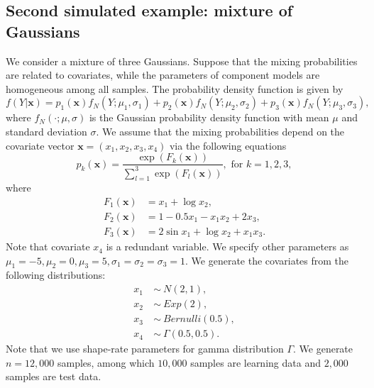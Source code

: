 \documentclass[11pt]{article}
\numberwithin{equation}{section}
\def\bx{\boldsymbol{x}}
\begin{document}
\subsection{Second simulated example: mixture of Gaussians}

We consider a mixture of three Gaussians. 
Suppose that the mixing probabilities are related to covariates, while the parameters of component models are homogeneous among all samples.
The probability density function is given by
\begin{equation}\label{gaussian-true}
f(Y|\bx)=p_1(\bx)f_N(Y;\mu_1,\sigma_1)+p_2(\bx)f_N(Y;\mu_2,\sigma_2)+p_3(\bx)f_N(Y;\mu_3,\sigma_3),
\end{equation}
where $f_N(\cdot;\mu,\sigma)$ is the Gaussian probability density function with mean $\mu$ and standard deviation $\sigma$.
We assume that the mixing probabilities depend on the covariate vector $\bx=(x_1,x_2,x_3,x_4)$ via the following equations
\begin{equation}\label{logistic-ex}
	p_k(\bx)=\frac{\exp\left(F_k(\bx)\right)}{\sum_{l=1}^{3}\exp\left(F_l(\bx)\right)}, \text{ for } k=1,2,3,
\end{equation}
where 
\begin{align*}
F_1(\bx)&=x_1+\log x_2,\\
 F_2(\bx)&=1-0.5x_1-x_1x_2+2x_3, \\
  F_3(\bx)&=2\sin x_1+\log x_2 + x_1x_3.
	\end{align*}
Note that covariate $x_4$ is a redundant variable.
We specify other parameters as $\mu_1=-5,\mu_2=0,\mu_3=5, \sigma_1=\sigma_2=\sigma_3=1$. We generate the  covariates from the following distributions:
   \begin{align*}
   	x_1~&\sim~ N(2,1),\\
   	x_2~&\sim~ Exp(2), \\
   	x_3~&\sim~ Bernulli(0.5), \\
   	x_4~&\sim~ \Gamma(0.5,0.5).
   \end{align*}
Note that we use shape-rate parameters for gamma distribution $\Gamma$.
We generate $n=12,000$ samples, among which $10,000$ samples are learning data and $2,000$ samples are test data.
\end{document}

